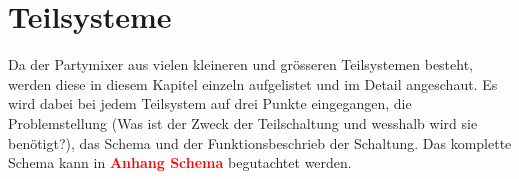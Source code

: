 \newpage
\section{Teilsysteme}
\label{sec:Teilsysteme}

Da der Partymixer aus vielen kleineren und grösseren Teilsystemen besteht, werden diese in diesem Kapitel einzeln aufgelistet und im Detail angeschaut.
Es wird dabei bei jedem Teilsystem auf drei Punkte eingegangen, die Problemstellung (Was ist der Zweck der Teilschaltung und wesshalb wird sie benötigt?), das Schema und der Funktionsbeschrieb der Schaltung. Das komplette Schema kann in  \textcolor{red}{\textbf{Anhang Schema}} begutachtet werden.

